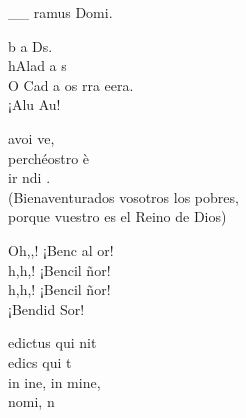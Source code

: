 \documentclass[12pt]{article}
\begin{document}
\begin{multicols*}{2}
\begin{cancion}[Adoramus te][Taizé]%
	__  ramus  Domi.\\
\end{cancion}%

\begin{cancion}%
	b a Ds. \\
	hAlad a s\\
	O Cad a os rra eera.\\
	¡Alu Au!\\
\end{cancion}%

\begin{cancion}%
	avoi ve,\\
	perchéostro è\\
	ir ndi .\\
(Bienaventurados vosotros los pobres,\\
porque vuestro es el Reino de Dios)\\
\end{cancion}%

\begin{cancion}%
	Oh,,! ¡Benc al or! \\
	h,h,! ¡Bencil ñor!\\
	h,h,! ¡Bencil ñor! \\
	¡Bendid Sor! \\
\end{cancion}%

\begin{cancion}%
	edictus qui nit\\
	edics qui t\\
	in ine, in mine,\\
	nomi, n\\
\end{cancion}%


\end{multicols*}
\end{document}
